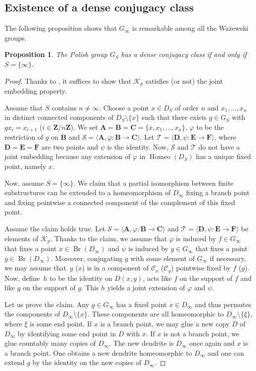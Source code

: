 \documentclass[JEP,XML,SOM,Unicode,NoFloatCountersInSection]{cedram}
\let\mathcal\mathscr
\theoremstyle{plain}
\newtheorem{prop}[thm]{Proposition}
\theoremstyle{definition}
\newcommand{\bA}{{\boldsymbol{A}}}
\newcommand{\bB}{{\boldsymbol{B}}}
\newcommand{\bC}{{\boldsymbol{C}}}
\newcommand{\bD}{{\boldsymbol{D}}}
\newcommand{\bE}{{\boldsymbol{E}}}
\newcommand{\bF}{{\boldsymbol{F}}}
\newcommand{\ZZ}{\mathbf{Z}}
\newcommand{\cC}{\mathcal{C}}
\newcommand{\cK}{\mathcal{K}}
\newcommand{\cS}{\mathcal{S}}
\newcommand{\cT}{\mathcal{T}}
\DeclareMathOperator{\Homeo}{Homeo}
\DeclareMathOperator{\Br}{Br}
\begin{document}
\subsection{Existence of a dense conjugacy class}
The following proposition shows that $G_\infty$ is remarkable among all the Wa\.zewski groups.
\begin{prop}\label{prop:jep} The Polish group $G_S$ has a dense conjugacy class if and only if $S=\{\infty\}$.
\end{prop}

\begin{proof} Thanks to \cite[Th.\,1.1]{Kechris-Rosendal}, it suffices to show that $\cK_p$ satisfies (or not) the joint embedding property.

Assume that $S$ contains $n\neq\infty$. Choose a point $x\in D_S$ of order $n$ and $x_1,\dots,x_n$ in distinct connected components of $D_S\setminus\{x\}$ such that there exists $g\in G_S$ with $gx_i=x_{i+1}$ ($i\in\ZZ/n\ZZ$). We set $\bA=\bB=\bC=\{x,x_1,\dots,x_n\}$, $\varphi$ to be the restriction of $g$ on $\bB$ and $\cS=\langle \bA,\varphi\colon\bB\to\bC\rangle$. Let $\cT=\langle \bD,\psi\colon\bE\to\bF\rangle$, where $\bD=\bE=\bF$ are two points and $\psi$ is the identity. Now, $\cS$ and $\cT$ do not have a joint embedding because any extension of $\varphi$ in $\Homeo(D_S)$ has a unique fixed point, namely $x$.

Now, assume $S=\{\infty\}$. We claim that a partial isomorphism between finite substructures can be extended to a homeomorphism of $D_\infty$ fixing a branch point and fixing pointwise a connected component of the complement of this fixed point.

Assume the claim holds true. Let $\cS=\langle \bA,\varphi\colon\bB\to\bC\rangle$ and $\cT=\langle \bD,\psi\colon\bE\to\bF\rangle$ be elements of $\cK_p$. Thanks to the claim, we assume that $\varphi$ is induced by $f\in G_\infty$ that fixes a point $x\in\Br(D_\infty)$ and $\psi$ is induced by $g\in G_\infty$ that fixes a point $y\in\Br(D_\infty)$. Moreover, conjugating $g$ with some element of $G_\infty$ if necessary, we may assume that~$y$ (\resp $x$) is in a component of $\cC_x$ (\resp $\cC_y$) pointwise fixed by $f$ (\resp $g$). Now, define~$h$ to be the identity on $D(x,y)$, acts like $f$ on the support of $f$ and like $g$ on the support of $g$. This $h$ yields a joint extension of $\varphi$ and $\psi$.

Let us prove the claim. Any $g\in G_\infty$ has a fixed point $x\in D_\infty$ and thus permutes the components of $D_\infty\setminus\{x\}$. These components are all homeomorphic to $D_\infty\setminus\{\xi\}$, where $\xi$ is some end point. If $x$ is a branch point, we may glue a new copy $D$ of $D_\infty$ by identifying some end point in $D$ with $x$. If $x$ is not a branch point, we glue countably many copies of $D_\infty$. The new dendrite is $D_\infty$ once again and $x$ is a branch point. One obtains a new dendrite homeomorphic to $D_\infty$ and one can extend $g$ by the identity on the new copies of $D_\infty$.\end{proof}
\end{document}
